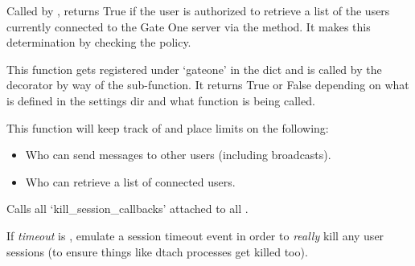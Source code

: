 \documentclass[letterpaper,10pt,openany]{sphinxmanual}
\begin{document}

\begin{fulllineitems}
\label{Developer/server:gateone.core.server.policy_list_users}
Called by {\hyperref[Developer/server:gateone.core.server.gateone_policies]{}}, returns True if the user is
authorized to retrieve a list of the users currently connected to the Gate
One server via the  method.
It makes this determination by checking the 
policy.

\end{fulllineitems}


\begin{fulllineitems}
\label{Developer/server:gateone.core.server.gateone_policies}
This function gets registered under `gateone' in the
 dict and is called by the
 decorator by way of the  sub-function. It
returns True or False depending on what is defined in the settings dir and
what function is being called.

This function will keep track of and place limits on the following:
\begin{itemize}
\item {} 
Who can send messages to other users (including broadcasts).

\item {} 
Who can retrieve a list of connected users.

\end{itemize}

\end{fulllineitems}


\begin{fulllineitems}
\label{Developer/server:gateone.core.server.kill_all_sessions}
Calls all `kill\_session\_callbacks' attached to all .

If \emph{timeout} is , emulate a session timeout event in order to
\emph{really} kill any user sessions (to ensure things like dtach processes get
killed too).

\end{fulllineitems}
\end{document}
